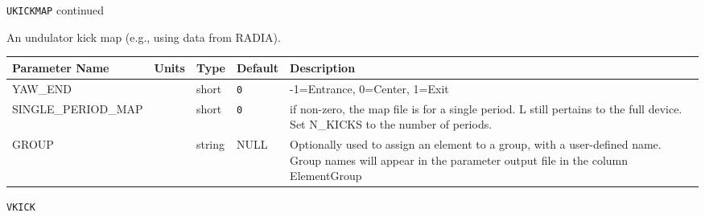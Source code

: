 \newpage
\begin{center}{\Large\verb|UKICKMAP| continued}\end{center}
An undulator kick map (e.g., using data from RADIA).
\\
\begin{tabular}{|l|l|l|l|p{\descwidth}|} \hline
Parameter Name & Units & Type & Default & Description \\ \hline 
YAW\_END &  & short &  \verb|0| & -1=Entrance, 0=Center, 1=Exit  \\ \hline 
SINGLE\_PERIOD\_MAP &  & short &  \verb|0| & if non-zero, the map file is for a single period. L still pertains to the full device. Set N\_KICKS to the number of periods.  \\ \hline 
GROUP &  & string & NULL & Optionally used to assign an element to a group, with a user-defined name.  Group names will appear in the parameter output file in the column ElementGroup  \\ \hline 
\end{tabular}

\vspace*{0.5in}

\newpage
\begin{center}{\Large\verb|VKICK|}\end{center}
